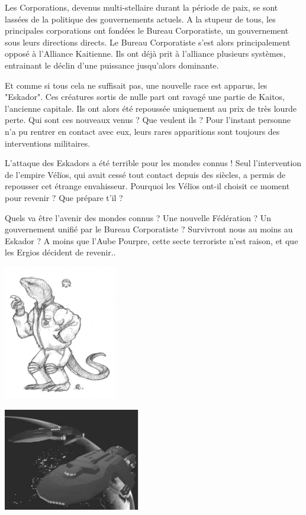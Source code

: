 \documentclass{DenebClass}
\begin{document}
\begin{multicols}{2}
Les Corporations, devenus multi-stellaire durant la période de paix, se sont lassées de la politique des gouvernements actuels. A la stupeur de tous, les principales corporations ont fondées le Bureau Corporatiste, un gouvernement sous leurs directions directs. Le Bureau Corporatiste s'est alors principalement opposé à l'Alliance Kaitienne. Ils ont déjà prit à l'alliance plusieurs systèmes, entrainant le déclin d'une puissance jusqu'alors dominante. 

Et comme si tous cela ne suffisait pas, une nouvelle race est apparus, les "Eskador". Ces créatures sortis de nulle part ont ravagé une partie de Kaitos, l'ancienne capitale. Ils ont alors été repoussée uniquement au prix de très lourde perte. Qui sont ces nouveaux venus ? Que veulent ils ? Pour l'instant personne n'a pu rentrer en contact avec eux, leurs rares apparitions sont toujours des interventions militaires. 

L'attaque des Eskadors a été terrible pour les mondes connus ! Seul l'intervention de l'empire Vélïos, qui avait cessé tout contact depuis des siècles, a permis de repousser cet étrange envahisseur. Pourquoi les Vélïos ont-il choisit ce moment pour revenir ? Que prépare t'il ?

Quels va être l'avenir des mondes connus ? Une nouvelle Fédération ? Un gouvernement unifié par le Bureau Corporatiste ? Survivront nous au moins au Eskador ? A moins que l'Aube Pourpre, cette secte terroriste n'est raison, et que les Ergios décident de revenir..

\begin{center}
	\includegraphics[width=140pt]{../Img/snagir}
\end{center}

\begin{center}
	\includegraphics[width=170pt]{../image/vaisseau5}
\end{center}


\end{multicols}
\end{document}
